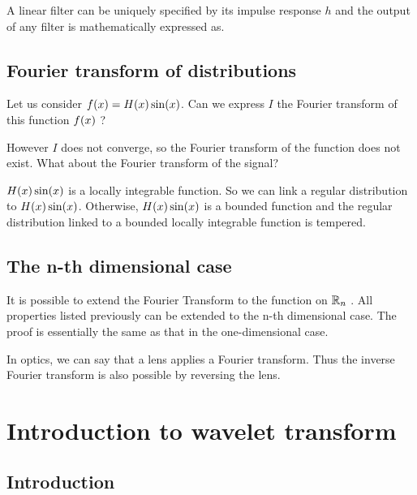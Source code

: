 \documentclass[11pt, openright]{book}
\begin{document}
A linear filter can be uniquely specified by its impulse response $h$ and the output of any filter is mathematically expressed as.



\subsection{Fourier transform of distributions}

Let us consider $\displaystyle{f(x)=H(x)\sin(x)}$. Can we express $I$ the Fourier transform of this function $\displaystyle{f(x)}$ ?

However $I$ does not converge, so the Fourier transform of the function does not exist. What about the Fourier transform of the signal?

$\displaystyle{H(x)\sin(x)}$ is a locally integrable function. So we can link a regular distribution to $\displaystyle{H(x)\sin(x)}$. Otherwise, $\displaystyle{H(x)\sin(x)}$ is a bounded function and the regular distribution linked to a bounded locally integrable function is tempered.

\subsection{The n-th dimensional case}
It is possible to extend the Fourier Transform to the function on $\displaystyle{\mathbb{R}_{n}}$ . All properties listed previously can be extended to the n-th dimensional case. The proof is essentially the same as that in the one-dimensional case.

In optics, we can say that a lens applies a Fourier transform. Thus the inverse Fourier transform is also possible by reversing the lens.


\section{Introduction to wavelet transform}

\subsection{Introduction}
\end{document}

